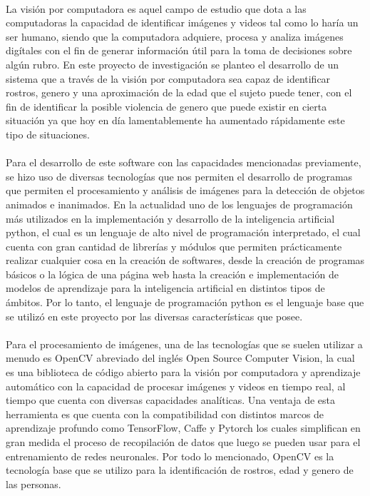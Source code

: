 \documentclass[9pt]{report}
\begin{document}
\begin{multicols}{2}
	\paragraph{}
	La visión por computadora es aquel campo de estudio que dota a las computadoras la capacidad de identificar imágenes y videos tal como lo haría un ser humano, siendo que la computadora adquiere, procesa y analiza imágenes digítales con el fin de generar información útil para la toma de decisiones sobre algún rubro. En este proyecto de investigación se planteo el desarrollo de un sistema que a través de la visión por computadora sea capaz de identificar rostros, genero y una aproximación de la edad que el sujeto puede tener, con el fin de identificar la posible violencia de genero que puede existir en cierta situación ya que hoy en día lamentablemente ha aumentado rápidamente este tipo de situaciones.
	\paragraph{}
	Para el desarrollo de este software con las capacidades mencionadas previamente, se hizo uso de diversas tecnologías que nos permiten el desarrollo de programas que permiten el procesamiento y análisis de imágenes para la detección de objetos animados e inanimados. En la actualidad uno de los lenguajes de programación más utilizados en la implementación y desarrollo de la inteligencia artificial python, el cual es un lenguaje de alto nivel de programación interpretado, el cual cuenta con gran cantidad de librerías y módulos que permiten prácticamente realizar cualquier cosa en la creación de softwares, desde la creación de programas básicos o la lógica de una página web hasta la creación e implementación de modelos de aprendizaje para la inteligencia artificial en distintos tipos de ámbitos. Por lo tanto, el lenguaje de programación python es el lenguaje base que se utilizó en este proyecto por las diversas características que posee.
	\paragraph{}
	Para el procesamiento de imágenes, una de las tecnologías que se suelen utilizar a menudo es OpenCV abreviado del inglés Open Source Computer Vision, la cual es una biblioteca de código abierto para la visión por computadora y aprendizaje automático con la capacidad de procesar imágenes y videos en tiempo real, al tiempo que cuenta con diversas capacidades analíticas. Una ventaja de esta herramienta es que cuenta con la compatibilidad con distintos marcos de aprendizaje profundo como TensorFlow, Caffe y Pytorch los cuales simplifican en gran medida el proceso de recopilación de datos que luego se pueden usar para el entrenamiento de redes neuronales. Por todo lo mencionado, OpenCV es la tecnología base que se utilizo para la identificación de rostros, edad y genero de las personas.

\end{multicols}
\end{document}
